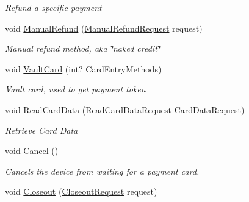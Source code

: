 \begin{DoxyCompactItemize}
\begin{DoxyCompactList}\small\item\em Refund a specific payment \end{DoxyCompactList}\item 
void \hyperlink{interfacecom_1_1clover_1_1remotepay_1_1sdk_1_1_i_clover_connector_a0216263a8b560a29f9c64778e37a136e}{Manual\+Refund} (\hyperlink{classcom_1_1clover_1_1remotepay_1_1sdk_1_1_manual_refund_request}{Manual\+Refund\+Request} request)
\begin{DoxyCompactList}\small\item\em Manual refund method, aka \char`\"{}naked credit\char`\"{} \end{DoxyCompactList}\item 
\mbox{\label{interfacecom_1_1clover_1_1remotepay_1_1sdk_1_1_i_clover_connector_a1d501a736452123be1dd8f42157389e3}} 
void \hyperlink{interfacecom_1_1clover_1_1remotepay_1_1sdk_1_1_i_clover_connector_a1d501a736452123be1dd8f42157389e3}{Vault\+Card} (int? Card\+Entry\+Methods)
\begin{DoxyCompactList}\small\item\em Vault card, used to get payment token \end{DoxyCompactList}\item 
\mbox{\label{interfacecom_1_1clover_1_1remotepay_1_1sdk_1_1_i_clover_connector_a841db6225c6a5df5e04918d9e2648fd1}} 
void \hyperlink{interfacecom_1_1clover_1_1remotepay_1_1sdk_1_1_i_clover_connector_a841db6225c6a5df5e04918d9e2648fd1}{Read\+Card\+Data} (\hyperlink{classcom_1_1clover_1_1remotepay_1_1sdk_1_1_read_card_data_request}{Read\+Card\+Data\+Request} Card\+Data\+Request)
\begin{DoxyCompactList}\small\item\em Retrieve Card Data \end{DoxyCompactList}\item 
void \hyperlink{interfacecom_1_1clover_1_1remotepay_1_1sdk_1_1_i_clover_connector_abbb999130d903a88e806c7b396c743f7}{Cancel} ()
\begin{DoxyCompactList}\small\item\em Cancels the device from waiting for a payment card. \end{DoxyCompactList}\item 
void \hyperlink{interfacecom_1_1clover_1_1remotepay_1_1sdk_1_1_i_clover_connector_ac4f3cd841d87046f329e98d058f65e55}{Closeout} (\hyperlink{classcom_1_1clover_1_1remotepay_1_1sdk_1_1_closeout_request}{Closeout\+Request} request)

\end{DoxyCompactItemize}
